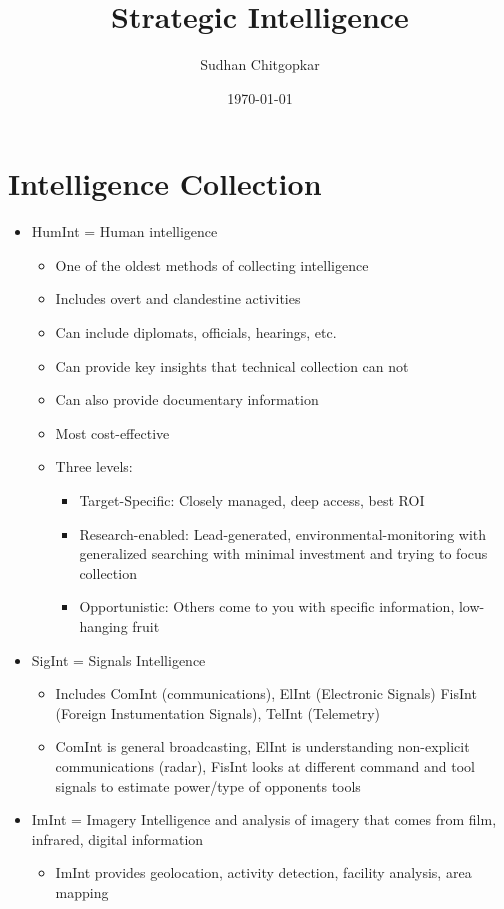 \documentclass[11pt]{article}
\author{Sudhan Chitgopkar}
\date{\today}
\title{Strategic Intelligence}
\begin{document}
\maketitle
\section*{Intelligence Collection}
\label{sec:org79dae46}
\begin{itemize}
\item HumInt = Human intelligence
\begin{itemize}
\item One of the oldest methods of collecting intelligence
\item Includes overt and clandestine activities
\item Can include diplomats, officials, hearings, etc.
\item Can provide key insights that technical collection can not
\item Can also provide documentary information
\item Most cost-effective
\item Three levels:
\begin{itemize}
\item Target-Specific: Closely managed, deep access, best ROI
\item Research-enabled: Lead-generated, environmental-monitoring with generalized searching with minimal investment and trying to focus collection
\item Opportunistic: Others come to you with specific information, low-hanging fruit
\end{itemize}
\end{itemize}
\item SigInt = Signals Intelligence
\begin{itemize}
\item Includes ComInt (communications), ElInt (Electronic Signals) FisInt (Foreign Instumentation Signals), TelInt (Telemetry)
\item ComInt is general broadcasting, ElInt is understanding non-explicit communications (radar), FisInt looks at different command and tool signals to estimate power/type of opponents tools
\end{itemize}
\item ImInt = Imagery Intelligence and analysis of imagery that comes from film, infrared, digital information
\begin{itemize}
\item ImInt provides geolocation, activity detection, facility analysis, area mapping

\end{itemize}
\end{itemize}
\end{document}
